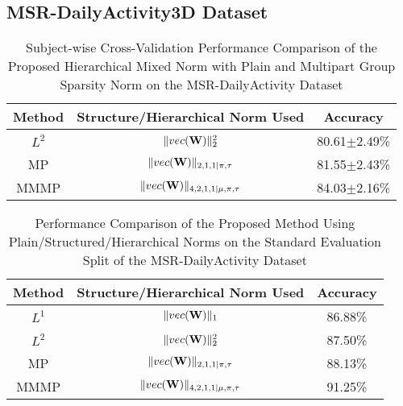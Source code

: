 \documentclass[9pt,technote,compsoc]{IEEEtran}
\begin{document}
\subsection{MSR-DailyActivity3D Dataset}

\begin{table}[!t]
	\renewcommand{\arraystretch}{1.3}
	\caption{Subject-wise Cross-Validation Performance Comparison of the Proposed Hierarchical Mixed Norm with Plain and Multipart Group Sparsity Norm on the MSR-DailyActivity Dataset}
	\label{table_msrdailyactivitynorms}
	\centering
	\begin{tabular}{|c||c||c|}
		\hline
		\bfseries Method & \bfseries Structure/Hierarchical Norm Used & \bfseries Accuracy \\\hline
		\hline
		$L^2$ & $\|vec({\bf W})\|_2^2$ & 80.61$\pm$2.49\%\\\hline
		MP & $\|vec({\bf W})\|_{2,1,1|\pi,\tau}$ & 81.55$\pm$2.43\%\\\hline
		MMMP & $\|vec({\bf W})\|_{4,2,1,1|\mu,\pi,\tau}$ & 84.03$\pm$2.16\%\\\hline
	\end{tabular}
\end{table}

\begin{table}[!t]
	\renewcommand{\arraystretch}{1.3}
	\caption{Performance Comparison of the Proposed Method Using Plain/Structured/Hierarchical Norms on the Standard Evaluation Split of the MSR-DailyActivity Dataset}
	\label{table_msrdailyactivitysettings}
	\centering
	\begin{tabular}{|c||c||c|}
		\hline
		\bfseries Method & \bfseries Structure/Hierarchical Norm Used & \bfseries Accuracy \\\hline
		\hline
		$L^1$ & $\|vec({\bf W})\|_1$ & 86.88\%\\\hline
		$L^2$ & $\|vec({\bf W})\|_2^2$ & 87.50\%\\\hline
		MP & $\|vec({\bf W})\|_{2,1,1|\pi,\tau}$ & 88.13\%\\\hline
		MMMP & $\|vec({\bf W})\|_{4,2,1,1|\mu,\pi,\tau}$ & 91.25\%\\\hline
	\end{tabular}
\end{table}
\end{document}
